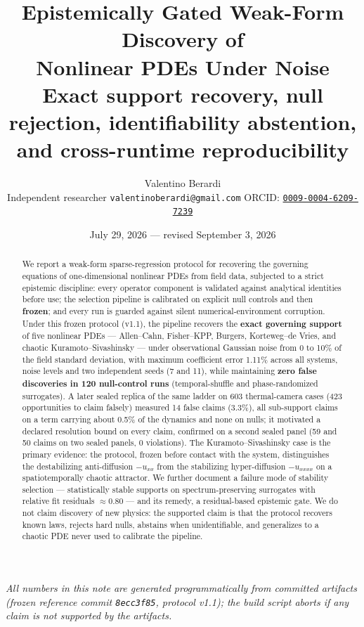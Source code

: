 \documentclass[11pt]{article}
\title{Epistemically Gated Weak-Form Discovery of\\
Nonlinear PDEs Under Noise\\[0.6em]
\large Exact support recovery, null rejection, identifiability abstention,\\
\large and cross-runtime reproducibility}
\author{Valentino Berardi\\
\small Independent researcher \quad \texttt{valentinoberardi@gmail.com} \quad
ORCID: \href{https://orcid.org/0009-0004-6209-7239}{\texttt{0009-0004-6209-7239}}}
\date{July 29, 2026 --- revised September 3, 2026}
\begin{document}
\maketitle

\begin{center}\small\itshape
All numbers in this note are generated programmatically from committed
artifacts (frozen reference commit \texttt{8ecc3f85}, protocol v1.1);
the build script aborts if any claim is not supported by the artifacts.
\end{center}

\begin{abstract}
We report a weak-form sparse-regression protocol for recovering the
governing equations of one-dimensional nonlinear PDEs from field data,
subjected to a strict epistemic discipline: every operator component is
validated against analytical identities before use; the selection pipeline
is calibrated on explicit null controls and then \textbf{frozen}; and every
run is guarded against silent numerical-environment corruption. Under this
frozen protocol (v1.1), the pipeline recovers the \textbf{exact governing
support} of five nonlinear PDEs --- Allen--Cahn, Fisher--KPP, Burgers,
Korteweg--de Vries, and chaotic Kuramoto--Sivashinsky --- under
observational Gaussian noise from 0 to 10\% of the field standard
deviation, with maximum coefficient error 1.11\% across all
systems, noise levels and two independent seeds (7 and 11), while maintaining \textbf{zero false
discoveries in 120 null-control runs} (temporal-shuffle and
phase-randomized surrogates). A later sealed replica of the same ladder on 603
thermal-camera cases (423 opportunities to claim falsely) measured 14
false claims (3.3\%), all sub-support claims on a term carrying
about 0.5\% of the dynamics and none on nulls; it motivated a declared
resolution bound on every claim, confirmed on a second sealed panel
(59 and 50 claims on two sealed panels, 0 violations). The Kuramoto--Sivashinsky case is the primary
evidence: the protocol, frozen before contact with the system, distinguishes
the destabilizing anti-diffusion $-u_{xx}$ from the stabilizing
hyper-diffusion $-u_{xxxx}$ on a spatiotemporally chaotic attractor. We
further document a failure mode of stability selection --- statistically
stable supports on spectrum-preserving surrogates with relative fit
residuals $\approx 0.80$ --- and its remedy, a residual-based
epistemic gate. We do not claim discovery of new physics: the supported
claim is that the protocol recovers known laws, rejects hard nulls, abstains
when unidentifiable, and generalizes to a chaotic PDE never used to
calibrate the pipeline.
\end{abstract}
\end{document}
